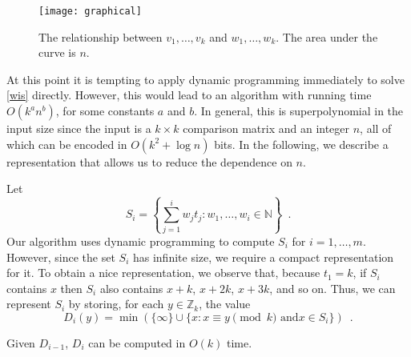 \documentclass[11pt,a4paper]{article}
\newcommand{\Z}{\mathbb{Z}}
\begin{document}
\begin{figure}
\begin{center}\texttt{[image: graphical]}\end{center}
\caption{The relationship between $v_1,\ldots,v_k$ and
$w_1,\ldots,w_k$. The area under the
curve is $n$.} 
\end{figure}

At this point it is tempting to apply dynamic programming immediately
to solve \eqref{wis} directly.  However, this would lead to an
algorithm with running time $O(k^a n^b)$, for some constants $a$ and
$b$.  In general, this is superpolynomial in the input size since the
input is a $k\times k$ comparison matrix and an integer $n$, all of
which can be encoded in $O(k^2 + \log n)$ bits.  In the following, we
describe a representation that allows us to reduce the dependence
on $n$.

Let 
\[ S_i = \left\{\sum_{j=1}^i w_jt_j : 
        w_1,\ldots,w_i\in \mathbb{N} \right\} 
\enspace .
\]
Our algorithm uses dynamic programming to compute $S_i$ for
$i=1,\ldots,m$.  However, since the set $S_i$ has infinite size, we
require a compact representation for it.  To obtain a nice
representation, we observe that, because $t_1=k$, if $S_i$ contains
$x$ then $S_i$ also contains $x+k$, $x+2k$, $x+3k$, and so on.  Thus,
we can represent $S_i$ by storing, for each $y\in \Z_k$,
the value 
\[
   D_{i}(y) = \min (\{\infty\}\cup\{x: \mbox{$x\equiv y\pmod k$ and
$x\in S_i$} \}) \enspace . 
\]
\begin{lem}
Given $D_{i-1}$, $D_i$ can be computed in $O(k)$ time.
\end{lem}
\end{document}
